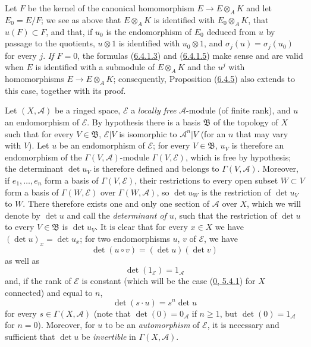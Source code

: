 \begin{remark}[6.4.7]
Let $F$ be the kernel of the canonical homomorphism $E\to E\otimes_AK$ and
let $E_0=E/F$; we see as above that $E\otimes_AK$ is identified with
$E_0\otimes_AK$, that $u(F)\subset F$, and that, if $u_0$ is the
endomorphism of $E_0$ deduced from $u$ by passage to the quotients,
$u\otimes1$ is identified with $u_0\otimes1$, and
$\sigma_j(u)=\sigma_j(u_0)$ for every $j$. \emph{If $F=0$}, the formulas
(\hyperref[II.6.4.1.3]{6.4.1.3}) and
(\hyperref[II.6.4.1.5]{6.4.1.5}) make sense and are valid when $E$ is
identified with a submodule of $E\otimes_AK$ and the $u^j$ with
homomorphisms $E\to E\otimes_AK$; consequently, Proposition
(\hyperref[II.6.4.5]{6.4.5}) also extends to this case, together with its
proof.
\end{remark}

\begin{env}[6.4.8]
\label{II.6.4.8}
Let $(X,\mathcal{A})$ be a ringed space, $\mathcal{E}$ a \emph{locally free}
$\mathcal{A}$-module (of finite rank), and $u$ an endomorphism of
$\mathcal{E}$. By hypothesis there is a basis $\mathfrak{B}$ of the topology
of $X$ such that for every $V\in\mathfrak{B}$, $\mathcal{E}|V$ is isomorphic
to $\mathcal{A}^n|V$ (for an $n$ that may vary with $V$). Let $u$ be an
endomorphism of $\mathcal{E}$; for every $V\in\mathfrak{B}$, $u_V$ is
therefore an endomorphism of the $\Gamma(V,\mathcal{A})$-module
$\Gamma(V,\mathcal{E})$, which is free by hypothesis; the determinant
$\det u_V$ is therefore defined and belongs to $\Gamma(V,\mathcal{A})$.
Moreover, if $e_1,\ldots,e_n$ form a basis of $\Gamma(V,\mathcal{E})$, their
restrictions to every open subset $W\subset V$ form a basis of
$\Gamma(W,\mathcal{E})$ over $\Gamma(W,\mathcal{A})$, so $\det u_W$ is the
restriction of $\det u_V$ to $W$. There therefore exists one and only one
section of $\mathcal{A}$ over $X$, which we will denote by $\det u$ and call
the \emph{determinant of $u$}, such that the restriction of $\det u$ to every
$V\in\mathfrak{B}$ is $\det u_V$. It is clear that for every $x\in X$ we have
$(\det u)_x=\det u_x$; for two endomorphisms $u$, $v$ of $\mathcal{E}$, we
have
\[
\label{II.6.4.8.1}
\det(u\circ v)=(\det u)(\det v)
\tag{6.4.8.1}
\]
as well as
\[
\label{II.6.4.8.2}
\det(1_{\mathcal{E}})=1_{\mathcal{A}}
\tag{6.4.8.2}
\]
and, if the rank of $\mathcal{E}$ is constant (which will be the case
(\hyperref[0.5.4.1]{0, 5.4.1}) for $X$ connected) and equal to $n$,
\[
\label{II.6.4.8.3}
\det(s\cdot u)=s^n\det u
\tag{6.4.8.3}
\]
for every $s\in\Gamma(X,\mathcal{A})$ (note that $\det(0)=0_{\mathcal{A}}$
if $n\geq1$, but $\det(0)=1_{\mathcal{A}}$ for $n=0$). Moreover, for $u$ to
be an \emph{automorphism} of $\mathcal{E}$, it is necessary and sufficient
that $\det u$ be \emph{invertible} in $\Gamma(X,\mathcal{A})$.


\end{env}
